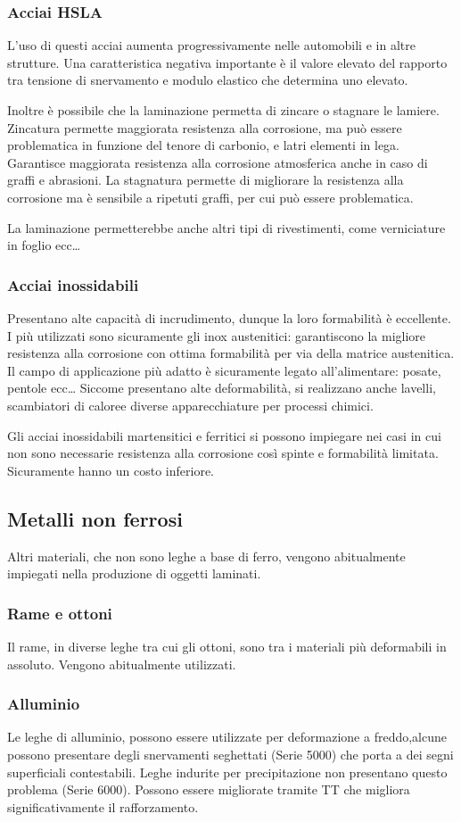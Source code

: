 \subsubsection{Acciai HSLA}
L'uso di questi acciai aumenta progressivamente nelle automobili e in altre strutture. Una caratteristica negativa importante è il valore elevato del rapporto tra tensione di snervamento e modulo elastico che determina uno  elevato.

Inoltre è possibile che la laminazione permetta di zincare o stagnare le lamiere.
Zincatura permette maggiorata resistenza alla corrosione, ma può essere problematica in funzione del tenore di carbonio, e latri elementi in lega. Garantisce maggiorata resistenza alla corrosione atmosferica anche in caso di graffi e abrasioni.
La stagnatura permette di migliorare la resistenza alla corrosione ma è sensibile a ripetuti graffi, per cui può essere problematica.

La laminazione permetterebbe anche altri tipi di rivestimenti, come verniciature in foglio ecc\dots

\subsubsection{Acciai inossidabili}
Presentano alte capacità di incrudimento, dunque la loro formabilità è eccellente.
I più utilizzati sono sicuramente gli inox austenitici: garantiscono la migliore resistenza alla corrosione con ottima formabilità per via della matrice austenitica.
Il campo di applicazione più adatto è sicuramente legato all'alimentare: posate, pentole ecc\dots
Siccome presentano alte deformabilità, si realizzano anche lavelli, scambiatori di caloree diverse apparecchiature per processi chimici.

Gli acciai inossidabili martensitici e ferritici si possono impiegare nei casi in cui non sono necessarie resistenza alla corrosione così spinte e formabilità limitata.
Sicuramente hanno un costo inferiore.

\subsection{Metalli non ferrosi}
Altri materiali, che non sono leghe a base di ferro, vengono abitualmente impiegati nella produzione di oggetti laminati.

\subsubsection{Rame e ottoni}
Il rame, in diverse leghe tra cui gli ottoni, sono tra i materiali più deformabili in assoluto. Vengono abitualmente utilizzati.

\subsubsection{Alluminio}
Le leghe di alluminio, possono essere utilizzate per deformazione a freddo,alcune possono presentare degli snervamenti seghettati (Serie 5000) che porta a dei segni superficiali contestabili. Leghe indurite per precipitazione non presentano questo problema (Serie 6000).
Possono essere migliorate tramite \ac{TT} che migliora significativamente il rafforzamento. 
